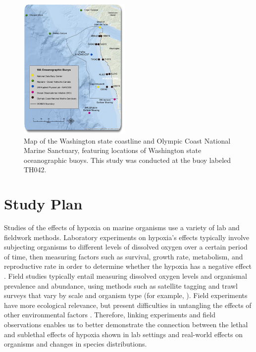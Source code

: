 \documentclass[12pt,twoside]{reedthesis}
\begin{document}
\begin{figure}
	\begin{center}
		\includegraphics[width=0.48\textwidth]{Fig_OCNMS_buoy_map}
		\caption[Map of oceanographic moorings in OCNMS]{\footnotesize{Map of the Washington state coastline and Olympic Coast National Marine Sanctuary, featuring locations of Washington state oceanographic buoys. This study was conducted at the buoy labeled TH042. }} %
		\label{OCNMSbuoys}
	\end{center}
\end{figure} 

\section{Study Plan}

Studies of the effects of hypoxia on marine organisms use a variety of lab and fieldwork methods. Laboratory experiments on hypoxia's effects typically involve subjecting organisms to different levels of dissolved oxygen over a certain period of time, then measuring factors such as survival, growth rate, metabolism, and reproductive rate in order to determine whether the hypoxia has a negative effect \autocite{Steckbauer2020}. Field studies typically entail measuring dissolved oxygen levels and organismal prevalence and abundance, using methods such as satellite tagging and trawl surveys that vary by scale and organism type (for example, \autocite{Keister2020}). Field experiments have more ecological relevance, but present difficulties in untangling the effects of other environmental factors \autocite{Borges2022, Boyd2018}. Therefore, linking experiments and field observations enables us to better demonstrate the connection between the lethal and sublethal effects of hypoxia shown in lab settings and real-world effects on organisms and changes in species distributions.
\end{document}
